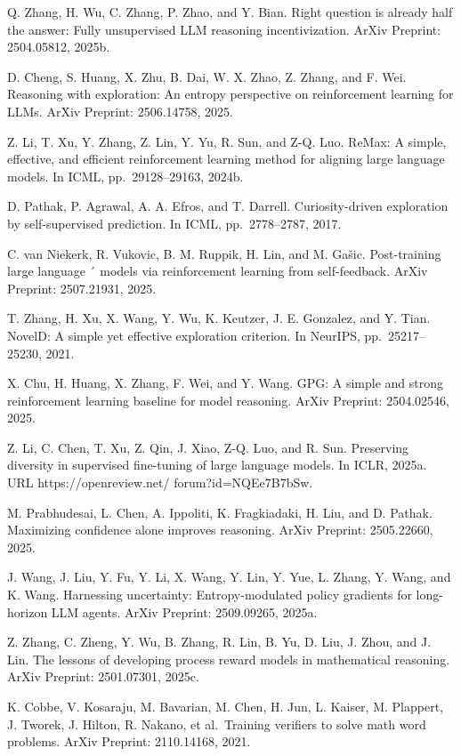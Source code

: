 \documentclass[
  10
]{article}
\begin{document}
Q. Zhang, H. Wu, C. Zhang, P. Zhao, and Y. Bian. Right question is
already half the answer: Fully unsupervised LLM reasoning
incentivization. ArXiv Preprint: 2504.05812, 2025b.

D. Cheng, S. Huang, X. Zhu, B. Dai, W. X. Zhao, Z. Zhang, and F. Wei.
Reasoning with exploration: An entropy perspective on reinforcement
learning for LLMs. ArXiv Preprint: 2506.14758, 2025.

Z. Li, T. Xu, Y. Zhang, Z. Lin, Y. Yu, R. Sun, and Z-Q. Luo. ReMax: A
simple, effective, and efficient reinforcement learning method for
aligning large language models. In ICML, pp.~29128--29163, 2024b.

D. Pathak, P. Agrawal, A. A. Efros, and T. Darrell. Curiosity-driven
exploration by self-supervised prediction. In ICML, pp.~2778--2787,
2017.

C. van Niekerk, R. Vukovic, B. M. Ruppik, H. Lin, and M. Gašic.
Post-training large language ´ models via reinforcement learning from
self-feedback. ArXiv Preprint: 2507.21931, 2025.

T. Zhang, H. Xu, X. Wang, Y. Wu, K. Keutzer, J. E. Gonzalez, and Y.
Tian. NovelD: A simple yet effective exploration criterion. In NeurIPS,
pp.~25217--25230, 2021.

X. Chu, H. Huang, X. Zhang, F. Wei, and Y. Wang. GPG: A simple and
strong reinforcement learning baseline for model reasoning. ArXiv
Preprint: 2504.02546, 2025.

Z. Li, C. Chen, T. Xu, Z. Qin, J. Xiao, Z-Q. Luo, and R. Sun. Preserving
diversity in supervised fine-tuning of large language models. In ICLR,
2025a. URL https://openreview.net/ forum?id=NQEe7B7bSw.

M. Prabhudesai, L. Chen, A. Ippoliti, K. Fragkiadaki, H. Liu, and D.
Pathak. Maximizing confidence alone improves reasoning. ArXiv Preprint:
2505.22660, 2025.

J. Wang, J. Liu, Y. Fu, Y. Li, X. Wang, Y. Lin, Y. Yue, L. Zhang, Y.
Wang, and K. Wang. Harnessing uncertainty: Entropy-modulated policy
gradients for long-horizon LLM agents. ArXiv Preprint: 2509.09265,
2025a.

Z. Zhang, C. Zheng, Y. Wu, B. Zhang, R. Lin, B. Yu, D. Liu, J. Zhou, and
J. Lin. The lessons of developing process reward models in mathematical
reasoning. ArXiv Preprint: 2501.07301, 2025c.

K. Cobbe, V. Kosaraju, M. Bavarian, M. Chen, H. Jun, L. Kaiser, M.
Plappert, J. Tworek, J. Hilton, R. Nakano, et al.~Training verifiers to
solve math word problems. ArXiv Preprint: 2110.14168, 2021.
\end{document}
